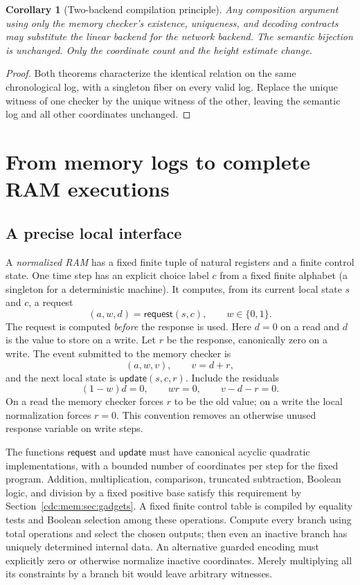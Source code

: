 \documentclass[11pt,a4paper]{article}
\newtheorem{corollary}[corollary]{Corollary}
\theoremstyle{definition}
\theoremstyle{remark}
\newcommand{\srctag}[1]{\texorpdfstring{\hspace{0.5em}{\normalfont\small\color{accent}[#1]}}{ [#1]}}
\begin{document}
\begin{corollary}[Two-backend compilation principle]\label{cdc:mem:cor:two-backends}
Any composition argument using only the memory checker's existence,
uniqueness, and decoding contracts may substitute the linear backend for the
network backend. The semantic bijection is unchanged. Only the coordinate
count and the height estimate change.
\end{corollary}
\begin{proof}
Both theorems characterize the identical relation on the same chronological
log, with a singleton fiber on every valid log. Replace the unique witness of
one checker by the unique witness of the other, leaving the semantic log and
all other coordinates unchanged.
\end{proof}

\section{From memory logs to complete RAM executions\srctag{03}}\label{cdc:mem:sec:ram}
\subsection{A precise local interface}
A \emph{normalized RAM} has a fixed finite tuple of natural registers and a
finite control state. One time step has an explicit choice label $c$ from a
fixed finite alphabet (a singleton for a deterministic machine). It computes,
from its current local state $s$ and $c$, a request
\[
 (a,w,d)=\mathsf{request}(s,c),\qquad w\in\{0,1\}.
\]
The request is computed \emph{before} the response is used. Here $d=0$ on a
read and $d$ is the value to store on a write. Let $r$ be the response,
canonically zero on a write. The event submitted to the memory checker is
\begin{equation}\label{cdc:mem:eq:request-event}
 (a,w,v),\qquad v=d+r,
\end{equation}
and the next local state is $\mathsf{update}(s,c,r)$. Include the residuals
\begin{equation}\label{cdc:mem:eq:request-normalization}
 (1-w)d=0,\qquad wr=0,\qquad v-d-r=0.
\end{equation}
On a read the memory checker forces $r$ to be the old value; on a write the
local normalization forces $r=0$. This convention removes an otherwise unused
response variable on write steps.

The functions $\mathsf{request}$ and $\mathsf{update}$ must have canonical
acyclic quadratic implementations, with a bounded number of coordinates per
step for the fixed program. Addition, multiplication, comparison, truncated
subtraction, Boolean logic, and division by a fixed positive base satisfy this
requirement by Section~\ref{cdc:mem:sec:gadgets}. A fixed finite control table is
compiled by equality tests and Boolean selection among these operations.
Compute every branch using total operations and select the chosen outputs;
then even an inactive branch has uniquely determined internal data. An
alternative guarded encoding must explicitly zero or otherwise normalize
inactive coordinates. Merely multiplying all its constraints by a branch bit
would leave arbitrary witnesses.
\end{document}
